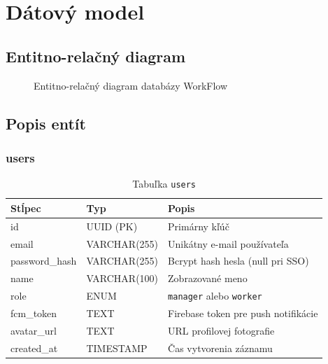 \chapter{Dátový model}

\section{Entitno-relačný diagram}

\begin{figure}[H]
  \centering
  \caption{Entitno-relačný diagram databázy WorkFlow}
\end{figure}

\section{Popis entít}

\subsection{users}
\begin{table}[H]
  \centering
  \begin{tabularx}{\textwidth}{llX}
    \toprule
    \textbf{Stĺpec} & \textbf{Typ} & \textbf{Popis} \\
    \midrule
    id            & UUID (PK)     & Primárny kľúč \\
    email         & VARCHAR(255)  & Unikátny e-mail používateľa \\
    password\_hash & VARCHAR(255) & Bcrypt hash hesla (null pri SSO) \\
    name          & VARCHAR(100)  & Zobrazované meno \\
    role          & ENUM          & \texttt{manager} alebo \texttt{worker} \\
    fcm\_token    & TEXT          & Firebase token pre push notifikácie \\
    avatar\_url   & TEXT          & URL profilovej fotografie \\
    created\_at   & TIMESTAMP     & Čas vytvorenia záznamu \\
    \bottomrule
  \end{tabularx}
  \caption{Tabuľka \texttt{users}}
\end{table}


